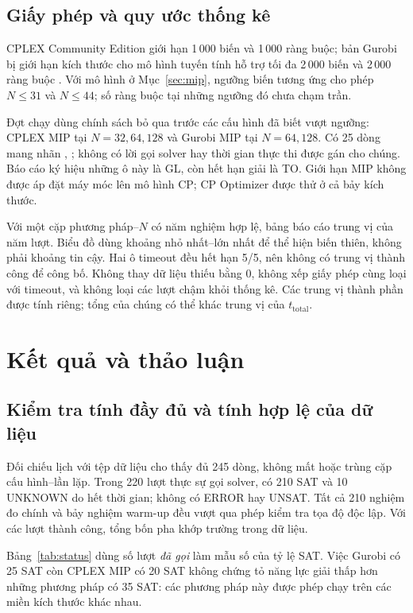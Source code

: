 \documentclass[a4paper,fleqn]{cas-sc}
\newcommand{\code}[1]{\texttt{\detokenize{#1}}}
\newcommand{\TO}{\textsf{TO}}
\newcommand{\GL}{\textsf{GL}}
\begin{document}
\subsection{Giấy phép và quy ước thống kê}
CPLEX Community Edition giới hạn 1\,000 biến và 1\,000 ràng buộc; bản Gurobi bị giới hạn kích thước cho mô hình tuyến tính hỗ trợ tối đa 2\,000 biến và 2\,000 ràng buộc \citep{ibmlicense,gurobilicense}. Với mô hình ở Mục~\ref{sec:mip}, ngưỡng biến tương ứng cho phép $N\leq31$ và $N\leq44$; số ràng buộc tại những ngưỡng đó chưa chạm trần.

Đợt chạy dùng chính sách bỏ qua trước các cấu hình đã biết vượt ngưỡng: CPLEX MIP tại $N=32,64,128$ và Gurobi MIP tại $N=64,128$. Có 25 dòng mang nhãn \code{LICENSE_LIMIT}, \code{attempted=False}; không có lời gọi solver hay thời gian thực thi được gán cho chúng. Báo cáo ký hiệu những ô này là \GL, còn hết hạn giải là \TO. Giới hạn MIP không được áp đặt máy móc lên mô hình CP; CP Optimizer được thử ở cả bảy kích thước.

Với một cặp phương pháp--$N$ có năm nghiệm hợp lệ, bảng báo cáo trung vị của năm lượt. Biểu đồ dùng khoảng nhỏ nhất--lớn nhất để thể hiện biến thiên, không phải khoảng tin cậy. Hai ô timeout đều hết hạn 5/5, nên không có trung vị thành công để công bố. Không thay dữ liệu thiếu bằng 0, không xếp giấy phép cùng loại với timeout, và không loại các lượt chậm khỏi thống kê. Các trung vị thành phần được tính riêng; tổng của chúng có thể khác trung vị của $t_{\mathrm{total}}$.

\section{Kết quả và thảo luận}\label{sec:results}
\subsection{Kiểm tra tính đầy đủ và tính hợp lệ của dữ liệu}
Đối chiếu lịch với tệp dữ liệu cho thấy đủ 245 dòng, không mất hoặc trùng cặp cấu hình--lần lặp. Trong 220 lượt thực sự gọi solver, có 210 SAT và 10 UNKNOWN do hết thời gian; không có ERROR hay UNSAT. Tất cả 210 nghiệm đo chính và bảy nghiệm warm-up đều vượt qua phép kiểm tra tọa độ độc lập. Với các lượt thành công, tổng bốn pha khớp trường \code{total_s} trong dữ liệu.



Bảng~\ref{tab:status} dùng số lượt \emph{đã gọi} làm mẫu số của tỷ lệ SAT. Việc Gurobi có 25 SAT còn CPLEX MIP có 20 SAT không chứng tỏ năng lực giải thấp hơn những phương pháp có 35 SAT: các phương pháp này được phép chạy trên các miền kích thước khác nhau.
\end{document}
